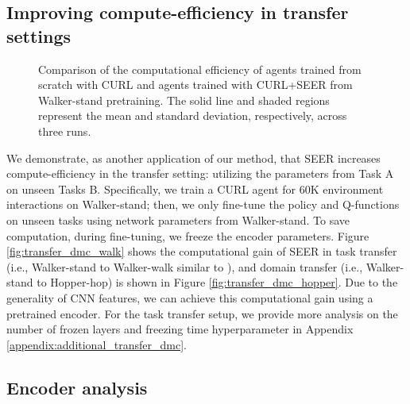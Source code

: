 \documentclass{article}
\begin{document}
\subsection{Improving compute-efficiency in transfer settings}

\begin{wrapfigure}{r}{0.48\textwidth} \centering
\vspace{-10mm}
\caption{Comparison of the computational efficiency of agents trained from scratch with CURL and agents trained with CURL+SEER from Walker-stand pretraining. The solid line and shaded regions represent the mean and standard deviation, respectively, across three runs.}
\vspace{-0.2in}
\end{wrapfigure}

We demonstrate, as another application of our method, that SEER increases compute-efficiency in the transfer setting: utilizing the parameters from Task A on unseen Tasks B.
Specifically,
we train a CURL agent for 60K environment interactions on Walker-stand; 
then, we only fine-tune the policy and Q-functions on unseen tasks using network parameters from Walker-stand.
To save computation, during fine-tuning, we freeze the encoder parameters.
Figure \ref{fig:transfer_dmc_walk} shows the computational gain of SEER in task transfer (i.e., Walker-stand to Walker-walk similar to \citet{yarats2019improving}), and domain transfer (i.e., Walker-stand to Hopper-hop) is shown in Figure \ref{fig:transfer_dmc_hopper}. Due to the generality of CNN features,
we can achieve this computational gain using a pretrained encoder.
For the task transfer setup, we provide more analysis on the number of frozen layers and freezing time hyperparameter  in Appendix \ref{appendix:additional_transfer_dmc}.





\subsection{Encoder analysis}
\end{document}
